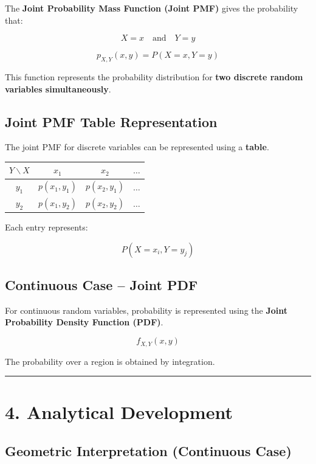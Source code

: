 \documentclass[12pt]{article}
\begin{document}
The \textbf{Joint Probability Mass Function (Joint PMF)} gives the probability that:

\[
X = x \quad \text{and} \quad Y = y
\]

\[
p_{X,Y}(x,y) = P(X = x, Y = y)
\]

This function represents the probability distribution for \textbf{two discrete random variables simultaneously}.

\subsection*{Joint PMF Table Representation}

The joint PMF for discrete variables can be represented using a \textbf{table}.

\begin{center}
\begin{tabular}{cccc}
\toprule
$Y \backslash X$ & $x_1$ & $x_2$ & $\dots$ \\
\midrule
$y_1$ & $p(x_1,y_1)$ & $p(x_2,y_1)$ & $\dots$ \\
$y_2$ & $p(x_1,y_2)$ & $p(x_2,y_2)$ & $\dots$ \\
\bottomrule
\end{tabular}
\end{center}

Each entry represents:

\[
P(X = x_i, Y = y_j)
\]

\subsection*{Continuous Case – Joint PDF}

For continuous random variables, probability is represented using the \textbf{Joint Probability Density Function (PDF)}.

\[
f_{X,Y}(x,y)
\]

The probability over a region is obtained by integration.

\hrule
\vspace{0.5cm}

\newpage
\section*{4. Analytical Development}

\subsection*{Geometric Interpretation (Continuous Case)}
\end{document}
